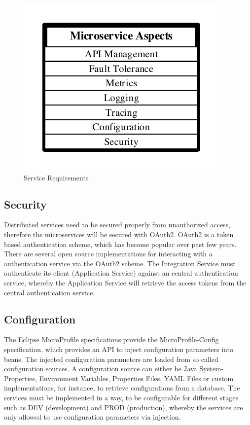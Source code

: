 \begin{figure}[htbp]
	\centering
	\includegraphics[scale=1]{images/esboc-requirement-services.pdf}
	\caption{Service Requirements}
	\label{fig:esboc-aspects}
\end{figure} 


\subsection{Security}
\label{sec:esboc-aspects-security}
Distributed services need to be secured properly from unauthorized access, therefore the microservices will be secured with OAuth2. OAuth2 is a token based authentication scheme, which has become popular over past few years. There are several open source implementations for interacting with a authentication service via the OAuth2 scheme. The Integration Service must authenticate its client (Application Service) against an central authentication service, whereby the Application Service will retrieve the access tokens from the central authentication service\cite{OAuth2018}.

\subsection{Configuration}
\label{sec:esboc-aspects-config}
The Eclipse MicroProfile specifications provide the MicroProfile-Config specification, which provides an API to inject configuration parameters into beans. The injected configuration parameters are loaded from so called configuration sources. A configuration source can either be Java System-Properties, Environment Variables, Properties Files, YAML Files or custom implementations, for instance, to retrieve configurations from a database. The services must be implemented in a way, to be configurable for different stages such as DEV (development) and PROD (production), whereby  the services are only allowed to use configuration parameters via injection\cite{EclipseMicroprofileConfig2018}.

